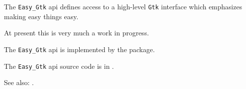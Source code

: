
The {\tt Easy\_Gtk} api defines access to a high-level {\tt Gtk} interface 
which emphasizes making easy things easy.

At present this is very much a work in progress.

The {\tt Easy\_Gtk} api is implemented by the  package.

The {\tt Easy\_Gtk} api source code is in .

See also:  .



